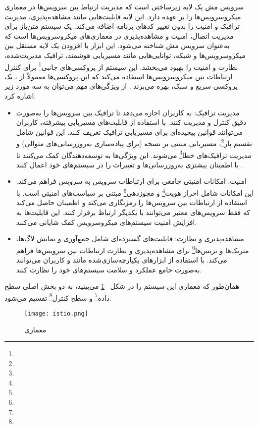 سرویس مش یک لایه زیرساختی است که مدیریت ارتباط بین سرویس‌ها در معماری میکروسرویس‌ها را بر عهده دارد. این لایه قابلیت‌هایی مانند مشاهده‌پذیری، مدیریت ترافیک و امنیت را بدون تغییر کدهای برنامه اضافه می‌کند.  یک سیستم متن‌باز برای مدیریت اتصال، امنیت و مشاهده‌پذیری در معماری‌های میکروسرویس‌ها است که به‌عنوان سرویس مش شناخته می‌شود. این ابزار با افزودن یک لایه مستقل بین میکروسرویس‌ها و شبکه، توانایی‌هایی مانند مسیریابی هوشمند، ترافیک مدیریت‌شده، نظارت و امنیت را بهبود می‌بخشد. این سیستم از پروکسی‌های جانبی\footnote{} برای کنترل ارتباطات بین میکروسرویس‌ها استفاده می‌کند که این پروکسی‌ها معمولاً از ، یک پروکسی سریع و سبک، بهره می‌برند \cite{Istio2}. از ویژگی‌های مهم  می‌توان به سه مورد زیر اشاره کرد:
\begin{itemize}
	\item 
	مدیریت ترافیک:
	به کاربران اجازه می‌دهد تا ترافیک بین سرویس‌ها را به‌صورت دقیق کنترل و مدیریت کنند. با استفاده از قابلیت‌های مسیریابی پیشرفته، کاربران می‌توانند قوانین پیچیده‌ای برای مسیریابی ترافیک تعریف کنند. این قوانین شامل تقسیم بار\footnote{}، مسیریابی مبتنی بر نسخه (برای پیاده‌سازی به‌روزرسانی‌های متوالی) و مدیریت ترافیک‌های خطا\footnote{} می‌شوند. این ویژگی‌ها به توسعه‌دهندگان کمک می‌کنند تا با اطمینان بیشتری به‌روزرسانی‌ها و تغییرات را در سیستم‌های خود اعمال کنند \cite{Istio2}.
	\item 
	امنیت:
	امکانات امنیتی جامعی برای ارتباطات سرویس به سرویس فراهم می‌کند. این امکانات شامل احراز هویت\footnote{} و مجوزدهی\footnote{} مبتنی بر سیاست‌های امنیتی است.  با استفاده از  ارتباطات بین سرویس‌ها را رمزنگاری می‌کند و اطمینان حاصل می‌کند که فقط سرویس‌های معتبر می‌توانند با یکدیگر ارتباط برقرار کنند. این قابلیت‌ها به افزایش امنیت سیستم‌های میکروسرویس کمک شایانی می‌کنند.
	\item
	مشاهده‌پذیری و نظارت:
	قابلیت‌های گسترده‌ای شامل جمع‌آوری و نمایش لاگ‌ها، متریک‌ها و تریس‌ها\footnote{} برای مشاهده‌پذیری و نظارت ارتباطات بین سرویس‌ها فراهم می‌کند. با استفاده از ابزارهای یکپارچه‌سازی‌شده مانند  و  کاربران می‌توانند به‌صورت جامع عملکرد و سلامت سیستم‌های خود را نظارت کنند.
\end{itemize}

همان‌طور که معماری این سیستم را در شکل 
~\ref{fig: istio arch}
می‌بینید،  به دو بخش اصلی سطح داده\footnote{} و سطح کنترل\footnote{} تقسیم می‌شود.

\begin{figure}[t]
	\centering
	\texttt{[image: istio.png]}
	\caption{معماری }
	\label{fig: istio arch}
\end{figure}

